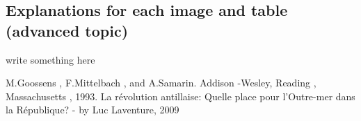 \documentclass{report}
\begin{document}
  \subsection{Explanations for each image and table (advanced topic)}
    write something here
    
    
\begin{thebibliography}{9}
M.Goossens , F.Mittelbach , and A.Samarin.
Addison -Wesley, Reading , Massachusetts , 1993.
La révolution antillaise: Quelle place pour l'Outre-mer dans la République? - by Luc Laventure, 2009
\end{thebibliography}

  
\end{document}
